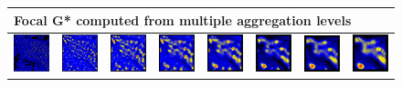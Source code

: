 \documentclass{itatnew}
\begin{document}
\begin{figure}[htp]
  \vspace{1em}
  \begin{tabular}{cccccccc}
    \multicolumn{8}{l}{Focal G* computed from multiple aggregation levels} \\
    \hline
    \includegraphics[width=4.6em]{images/gen-raw-zoom-focalgstar-1}&
    \includegraphics[width=4.6em]{images/gen-raw-zoom-focalgstar-2}&
    \includegraphics[width=4.6em]{images/gen-raw-zoom-focalgstar-3}&
    \includegraphics[width=4.6em]{images/gen-raw-zoom-focalgstar-4}&
    \includegraphics[width=4.6em]{images/gen-raw-zoom-focalgstar-5}&
    \includegraphics[width=4.6em]{images/gen-raw-zoom-focalgstar-6}&
    \includegraphics[width=4.6em]{images/gen-raw-zoom-focalgstar-7}&
    \includegraphics[width=4.6em]{images/gen-raw-zoom-focalgstar-8}\\
    

\end{tabular}
\end{figure}
\end{document}
